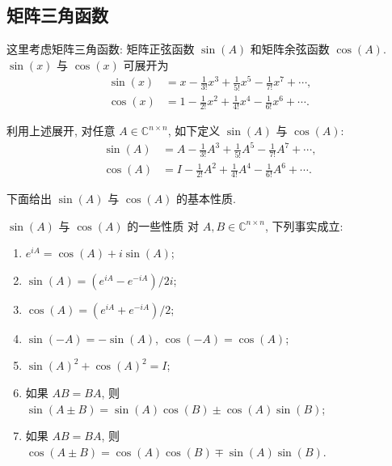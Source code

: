 \subsection{{矩阵三角函数}}\label{sec:matrix-trigonometric-functions}

{这里考虑矩阵三角函数: 矩阵正弦函数 $\sin(A)$ 和矩阵余弦函数 $\cos(A)$. $\sin(x)$ 与 $\cos(x)$ 可展开为}
\[\begin{aligned}\sin(x)&=x-\frac{1}{3!}x^3+\frac{1}{5!}x^5-\frac{1}{7!}x^7+\cdots,\\\cos(x)&=1-\frac{1}{2!}x^2+\frac{1}{4!}x^4-\frac{1}{6!}x^6+\cdots.\end{aligned}\]

{利用上述展开, 对任意 $A\in\mathbb{C}^{n\times n}$, 如下定义 $\sin(A)$ 与 $\cos(A)$:}
\[\begin{aligned}\sin(A)&=A-\frac{1}{3!}A^3+\frac{1}{5!}A^5-\frac{1}{7!}A^7+\cdots,\\\cos(A)&=I-\frac{1}{2!}A^2+\frac{1}{4!}A^4-\frac{1}{6!}A^6+\cdots.\end{aligned}\]

{下面给出 $\sin(A)$ 与 $\cos(A)$ 的基本性质.}

\begin{Theorem}{{$\sin(A)$ 与 $\cos(A)$ 的一些性质}}\label{thm:matrix-trigonometric-properties}
{对 $A,B\in\mathbb{C}^{n\times n}$, 下列事实成立:}
\begin{enumerate}[label=(\arabic*)]
\item\label{part:matrix-trig-euler} $e^{iA}=\cos(A)+i\sin(A)$;
\item\label{part:matrix-sine-exponentials} $\sin(A)=(e^{iA}-e^{-iA})/2i$;
\item\label{part:matrix-cosine-exponentials} $\cos(A)=(e^{iA}+e^{-iA})/2$;
\item $\sin(-A)=-\sin(A)$, $\cos(-A)=\cos(A)$;
\item $\sin(A)^2+\cos(A)^2=I$;
\item {如果 $AB=BA$, 则\newline{}$\sin(A\pm B)=\sin(A)\cos(B)\pm\cos(A)\sin(B)$;}
\item {如果 $AB=BA$, 则\newline{}$\cos(A\pm B)=\cos(A)\cos(B)\mp\sin(A)\sin(B)$.}
\end{enumerate}
\end{Theorem}

